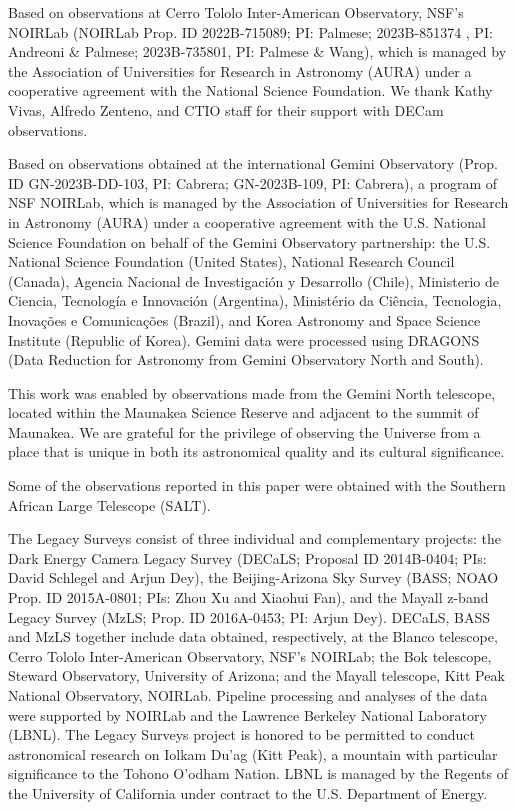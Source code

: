 \documentclass[twocolumn]{aastex631}
\begin{document}
Based on observations at Cerro Tololo Inter-American Observatory, NSF’s NOIRLab (NOIRLab Prop. ID 2022B-715089; PI: Palmese; 2023B-851374 , PI: Andreoni \& Palmese; 2023B-735801, PI: Palmese \& Wang), which is managed by the Association of Universities for Research in Astronomy (AURA) under a cooperative agreement with the National Science Foundation.
We thank Kathy Vivas, Alfredo Zenteno, and CTIO staff for their support with DECam observations.

Based on observations obtained at the international Gemini Observatory (Prop. ID GN-2023B-DD-103, PI: Cabrera; GN-2023B-109, PI: Cabrera), a program of NSF NOIRLab, which is managed by the Association of Universities for Research in Astronomy (AURA) under a cooperative agreement with the U.S. National Science Foundation on behalf of the Gemini Observatory partnership: the U.S. National Science Foundation (United States), National Research Council (Canada), Agencia Nacional de Investigaci\'{o}n y Desarrollo (Chile), Ministerio de Ciencia, Tecnolog\'{i}a e Innovaci\'{o}n (Argentina), Minist\'{e}rio da Ci\^{e}ncia, Tecnologia, Inova\c{c}\~{o}es e Comunica\c{c}\~{o}es (Brazil), and Korea Astronomy and Space Science Institute (Republic of Korea).
Gemini data were processed using DRAGONS (Data Reduction for Astronomy from Gemini Observatory North and South).

This work was enabled by observations made from the Gemini North telescope, located within the Maunakea Science Reserve and adjacent to the summit of Maunakea. We are grateful for the privilege of observing the Universe from a place that is unique in both its astronomical quality and its cultural significance.

Some of the observations reported in this paper were obtained with the Southern African Large Telescope (SALT).

The Legacy Surveys consist of three individual and complementary projects: the Dark Energy Camera Legacy Survey (DECaLS; Proposal ID 2014B-0404; PIs: David Schlegel and Arjun Dey), the Beijing-Arizona Sky Survey (BASS; NOAO Prop. ID 2015A-0801; PIs: Zhou Xu and Xiaohui Fan), and the Mayall z-band Legacy Survey (MzLS; Prop. ID 2016A-0453; PI: Arjun Dey). DECaLS, BASS and MzLS together include data obtained, respectively, at the Blanco telescope, Cerro Tololo Inter-American Observatory, NSF’s NOIRLab; the Bok telescope, Steward Observatory, University of Arizona; and the Mayall telescope, Kitt Peak National Observatory, NOIRLab. Pipeline processing and analyses of the data were supported by NOIRLab and the Lawrence Berkeley National Laboratory (LBNL). The Legacy Surveys project is honored to be permitted to conduct astronomical research on Iolkam Du’ag (Kitt Peak), a mountain with particular significance to the Tohono O’odham Nation. LBNL is managed by the Regents of the University of California under contract to the U.S. Department of Energy.
\end{document}
